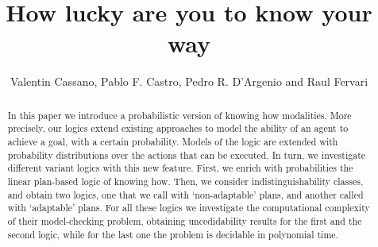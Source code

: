 \documentclass{article}
\begin{document}
\title{How lucky are you to know your way}
\author{Valentin Cassano, Pablo F. Castro, Pedro R. D'Argenio and Raul Fervari}
\date{}


\maketitle

\begin{abstract}
    In this paper we introduce a probabilistic version of knowing how modalities. More precisely, our logics extend existing approaches to model the ability of an agent to achieve a goal, with a certain probability. Models of the logic are extended with probability distributions over the actions that can be executed. In turn, we investigate different variant logics with this new feature. First, we enrich with probabilities the linear plan-based logic of knowing how. Then, we consider indistinguishability classes, and obtain two logics, one that we call with `non-adaptable' plans, and another called with `adaptable' plans. For all these logics we investigate the computational complexity of their model-checking problem, obtaining uncedidability results for the first and the second logic, while for the last one the problem is decidable in polynomial time.
\end{abstract}










\end{document}
